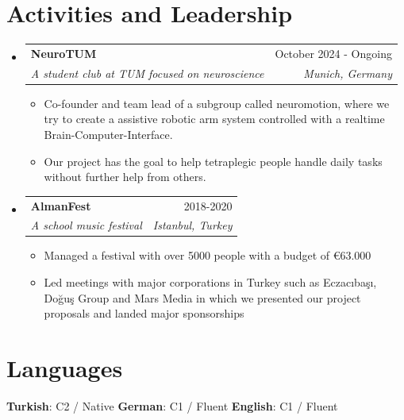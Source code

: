 \documentclass[a4paper,11pt]{article}
\makeatletter
\newcommand{\resumeItem}[1]{
  \item{
    {#1 \vspace{-4pt}}
  }
}
\newcommand{\resumeSubheading}[4]{
  \vspace{-2pt}\item
    \begin{tabular*}{0.97\textwidth}[t]{l@{\extracolsep{\fill}}r}
      \textbf{#1} & #2 \\
      \textit{\small #3} & \textit{\small #4} \\
    \end{tabular*}\vspace{-10pt}
}
\newcommand{\resumeSubHeadingListStart}{\begin{itemize}[leftmargin=0.15in, label={}]}
\newcommand{\resumeSubHeadingListEnd}{\end{itemize}}
\newcommand{\resumeItemListStart}{\begin{itemize}}
\newcommand{\resumeItemListEnd}{\end{itemize}\vspace{-2pt}}
\makeatother
\begin{document}
\section{Activities  and Leadership} 
\resumeSubHeadingListStart
\resumeSubheading
        {NeuroTUM}{October 2024 - Ongoing}
        {A student club at TUM focused on neuroscience}{Munich, Germany}
      \resumeItemListStart
      \vspace{0.1cm}
        \small\resumeItem{Co-founder and team lead of a subgroup called neuromotion, where we try to create a assistive robotic arm system controlled with a realtime Brain-Computer-Interface.}
        \vspace{0.05cm}
        \resumeItem{Our project has the goal to help tetraplegic people handle daily tasks without further help from others.}
        \vspace{0.05cm}
      
    \resumeItemListEnd
\resumeSubheading
        {AlmanFest}{2018-2020}
        {A school music festival}{Istanbul, Turkey}
      \resumeItemListStart
      \vspace{0.1cm}
        \small\resumeItem{Managed a festival with over 5000 people with a budget of €63.000}
        \vspace{0.05cm}
        \resumeItem{Led meetings with major corporations in Turkey such as Eczacıbaşı, Doğuş Group and Mars Media in which we presented our project proposals and landed major sponsorships}
    \resumeItemListEnd
\resumeSubHeadingListEnd
 

\section{Languages}
\newcommand{\langgap}{0.5cm} %
\noindent
\textbf{Turkish}: C2 / Native\hspace{\langgap}
\textbf{German}: C1 / Fluent\hspace{\langgap}
\textbf{English}: C1 / Fluent
\end{document}

